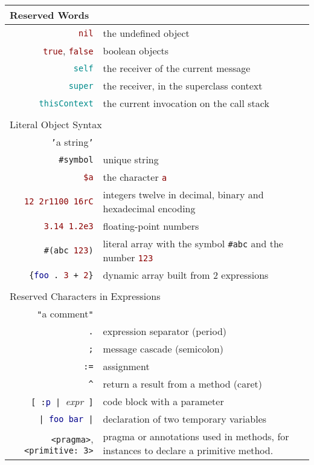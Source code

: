 \noindent
\begin{tabularx}{\linewidth}{@{}rX@{}}
	\multicolumn{2}{l}{Reserved Words}\\
	\midrule
	\textcolor{darkRed}{\texttt{nil}} & the undefined object\\
	\textcolor{darkRed}{\texttt{true}}, \textcolor{darkRed}{\texttt{false}} & boolean objects\\
	\textcolor{darkCyan}{\texttt{self}} & the receiver of the current message\\
	\textcolor{darkCyan}{\texttt{super}} & the receiver, in the superclass context\\
	\textcolor{darkCyan}{\texttt{thisContext}} & the current invocation on the call stack \\
	\\
	\multicolumn{2}{l}{Literal Object Syntax}\\
	\midrule
	\textcolor{string}{\texttt{'}{a string}\texttt{'}} & \\
	\textcolor{string}{\texttt{\#symbol}} & unique string \\
	\textcolor{darkRed}{\texttt{\$a}} & the character \textcolor{darkRed}{\texttt{a}} \\
	\textcolor{darkRed}{\texttt{12 2r1100 16rC}} & integers twelve in decimal, binary and hexadecimal encoding\\
	\textcolor{darkRed}{\texttt{3.14 1.2e3}} & floating-point numbers\\
	\texttt{\#(\textcolor{string}{abc} \textcolor{darkRed}{123})} & literal array with the symbol \textcolor{string}{\texttt{\#abc}} and the number \textcolor{darkRed}{\texttt{123}} \\
	\texttt{\{\textcolor{darkBlue}{foo}\,.\ \textcolor{darkRed}{3}\,+\,\textcolor{darkRed}{2}\}} & dynamic array built from 2 expressions\\
	
	\\
	\multicolumn{2}{l}{Reserved Characters in Expressions}\\
	\midrule
	\textcolor{comment}{\texttt{"}{a comment}\texttt{"}} & \\
	\texttt{.} & expression separator (period)\\
	\texttt{;} & message cascade (semicolon)\\
	\texttt{:=} & {assignment} \\
	\texttt{\textasciicircum} & return a result from a method (caret)\\
	\texttt{[\,:\textcolor{darkBlue}{p}\,|\,}\emph{expr}\texttt{\,]} & code block with a parameter \\
	\texttt{|\,\textcolor{darkBlue}{foo bar}\,|} & declaration of two temporary variables\\
	\texttt{<pragma>}, \texttt{<primitive: 3>} & pragma or annotations used in methods, for instances to declare a primitive method.
\end{tabularx}

